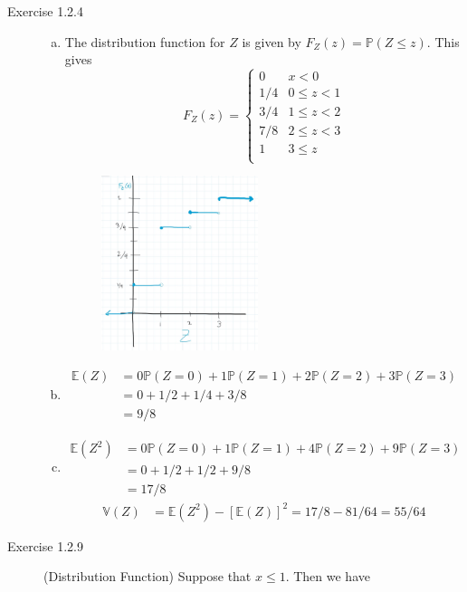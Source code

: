 \documentclass[12pt]{article}  %
\newcommand{\E}{{\mathbb{E}}}
\newcommand{\V}{{\mathbb{V}}}
\newcommand{\prob}{{\mathbb{P}}}
\begin{document}
\begin{description}
\item[Exercise 1.2.4] 
\begin{enumerate}[(a)]
	\item The distribution function for $Z$ is given by $F_Z(z) = \prob(Z\leq z)$. This gives \[F_Z(z) = \begin{cases} 
    0 & x< 0 \\
    1/4 & 0\leq z < 1\\
	3/4 & 1\leq z < 2\\
	7/8 & 2\leq z < 3\\
	1 & 3\leq z\\
   \end{cases}
\] 
\begin{figure}[h!]
  \centering
    \includegraphics[width=0.48\textwidth]{CDF.jpg}
\end{figure}
\item \begin{align*}
\E(Z) &= 0\prob(Z = 0) + 1\prob(Z = 1) + 2\prob(Z = 2) + 3\prob(Z = 3)\\
	  &= 0 + 1/2 + 1/4 + 3/8\\
	  &= 9/8
\end{align*}
\item \begin{align*}
\E(Z^2) &= 0\prob(Z = 0) + 1\prob(Z = 1) + 4\prob(Z = 2) + 9\prob(Z = 3)\\
	  &= 0 + 1/2 + 1/2 + 9/8\\
	  &= 17/8
\end{align*}
\begin{align*}
\V(Z) &= \E(Z^2) - [\E(Z)]^2 = 17/8 - 81/64 = 55/64
\end{align*}
\end{enumerate}
\item[Exercise 1.2.9] (Distribution Function) Suppose that $x\leq 1$. Then we have 

\end{description}
\end{document}
